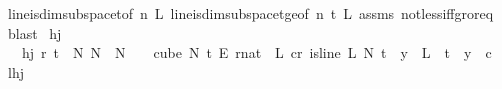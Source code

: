 \begin{isabellebody}
\ line{\isacharunderscore}{\kern0pt}is{\isacharunderscore}{\kern0pt}dim{}{\isacharunderscore}{\kern0pt}subspace{\isacharunderscore}{\kern0pt}t{\isacharunderscore}{\kern0pt}{}{\isacharbrackleft}{\kern0pt}of\ n\ L{\isacharbrackright}{\kern0pt}\ line{\isacharunderscore}{\kern0pt}is{\isacharunderscore}{\kern0pt}dim{}{\isacharunderscore}{\kern0pt}subspace{\isacharunderscore}{\kern0pt}t{\isacharunderscore}{\kern0pt}ge{\isacharunderscore}{\kern0pt}{}{\isacharbrackleft}{\kern0pt}of\ n\ t\ L{\isacharbrackright}{\kern0pt}\ assms\ not{\isacharunderscore}{\kern0pt}less{\isacharunderscore}{\kern0pt}iff{\isacharunderscore}{\kern0pt}gr{\isacharunderscore}{\kern0pt}or{\isacharunderscore}{\kern0pt}eq\ \isamarkupfalse%
\ blast%
\endisatagproof
{\isafoldproof}%
%
\isadelimproof
\isanewline
%
\endisadelimproof
\isanewline
{}\isamarkupfalse%
\ hj\ \isanewline
\ \ \ {\isachardoublequoteopen}hj\ r\ t\ {\isasymequiv}\ {\isacharparenleft}{\kern0pt}{\isasymexists}N{\isachargreater}{\kern0pt}{}{\isachardot}{\kern0pt}\ {\isasymforall}N{\isacharprime}{\kern0pt}\ {\isasymge}\ N{\isachardot}{\kern0pt}\ {\isasymforall}{\isasymchi}{\isachardot}{\kern0pt}\ {\isasymchi}\ {\isasymin}\ {\isacharparenleft}{\kern0pt}cube\ N{\isacharprime}{\kern0pt}\ t{\isacharparenright}{\kern0pt}\ {\isasymrightarrow}\isactrlsub E\ {\isacharbraceleft}{\kern0pt}{\isachardot}{\kern0pt}{\isachardot}{\kern0pt}{\isacharless}{\kern0pt}r{\isacharcolon}{\kern0pt}{\isacharcolon}{\kern0pt}nat{\isacharbraceright}{\kern0pt}\ {\isasymlongrightarrow}\ {\isacharparenleft}{\kern0pt}{\isasymexists}L{\isachardot}{\kern0pt}\ {\isasymexists}c{\isacharless}{\kern0pt}r{\isachardot}{\kern0pt}\ is{\isacharunderscore}{\kern0pt}line\ L\ N{\isacharprime}{\kern0pt}\ t\ {\isasymand}\ {\isacharparenleft}{\kern0pt}{\isasymforall}y\ {\isasymin}\ L\ {\isacharbackquote}{\kern0pt}\ {\isacharbraceleft}{\kern0pt}{\isachardot}{\kern0pt}{\isachardot}{\kern0pt}{\isacharless}{\kern0pt}t{\isacharbraceright}{\kern0pt}{\isachardot}{\kern0pt}\ {\isasymchi}\ y\ {\isacharequal}{\kern0pt}\ c{\isacharparenright}{\kern0pt}{\isacharparenright}{\kern0pt}{\isacharparenright}{\kern0pt}{\isachardoublequoteclose}\isanewline
\isanewline
{}\isamarkupfalse%
\ lhj\isanewline

\end{isabellebody}

